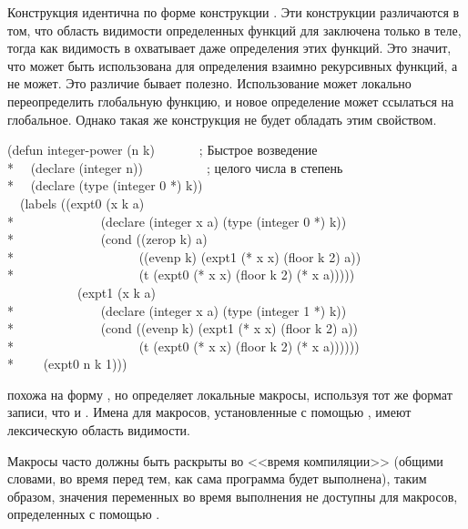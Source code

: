 \begin{defmac}
Конструкция  идентична по форме конструкции .
Эти конструкции различаются в том, что область видимости определенных функций
для  заключена только в теле, тогда как видимость в 
охватывает даже определения этих функций. Это значит, что  может
быть использована для определения взаимно рекурсивных функций, а  не
может. Это различие бывает полезно. Использование  может локально
переопределить глобальную функцию, и новое определение может ссылаться на
глобальное. Однако такая же конструкция  не будет обладать этим
свойством.
\begin{lisp}
(defun integer-power (n k)~~~~~~~; Быстрое возведение \\*
~~(declare (integer n))~~~~~~~~~~; целого числа в степень \\*
~~(declare (type (integer 0 *) k)) \\
~~(labels ((expt0 (x k a) \\*
~~~~~~~~~~~~~(declare (integer x a) (type (integer 0 *) k)) \\*
~~~~~~~~~~~~~(cond ((zerop k) a) \\*
~~~~~~~~~~~~~~~~~~~((evenp k) (expt1 (* x x) (floor k 2) a)) \\*
~~~~~~~~~~~~~~~~~~~(t (expt0 (* x x) (floor k 2) (* x a))))) \\
~~~~~~~~~~~(expt1 (x k a) \\*
~~~~~~~~~~~~~(declare (integer x a) (type (integer 1 *) k)) \\*
~~~~~~~~~~~~~(cond ((evenp k) (expt1 (* x x) (floor k 2) a)) \\*
~~~~~~~~~~~~~~~~~~~(t (expt0 (* x x) (floor k 2) (* x a)))))) \\*
~~~~(expt0 n k 1)))
\end{lisp}

 похожа на форму , но определяет локальные макросы,
используя тот же формат записи, что и .
Имена для макросов, установленные с помощью , имеют лексическую
область видимости.

Макросы часто должны быть раскрыты во <<время компиляции>> (общими словами,
во время перед тем, как сама программа будет выполнена), таким образом, значения
переменных во время выполнения не доступны для макросов, определенных с помощью
.


\end{defmac}
